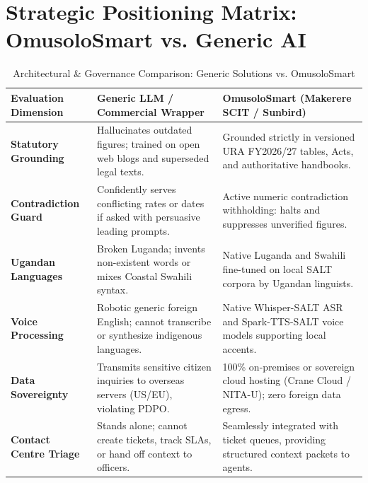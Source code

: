 \documentclass[10pt,a4paper]{article}
\begin{document}
\section{Strategic Positioning Matrix: OmusoloSmart vs. Generic AI}

\begin{table}[h!]
\centering
\small
\begin{tabularx}{\textwidth}{l X X}
\toprule
\textbf{Evaluation Dimension} & \textbf{Generic LLM / Commercial Wrapper} & \textbf{OmusoloSmart (Makerere SCIT / Sunbird)} \\
\midrule
\textbf{Statutory Grounding} & Hallucinates outdated figures; trained on open web blogs and superseded legal texts. & Grounded strictly in versioned URA FY2026/27 tables, Acts, and authoritative handbooks. \\
\addlinespace
\textbf{Contradiction Guard} & Confidently serves conflicting rates or dates if asked with persuasive leading prompts. & Active numeric contradiction withholding: halts and suppresses unverified figures. \\
\addlinespace
\textbf{Ugandan Languages} & Broken Luganda; invents non-existent words or mixes Coastal Swahili syntax. & Native Luganda and Swahili fine-tuned on local SALT corpora by Ugandan linguists. \\
\addlinespace
\textbf{Voice Processing} & Robotic generic foreign English; cannot transcribe or synthesize indigenous languages. & Native Whisper-SALT ASR and Spark-TTS-SALT voice models supporting local accents. \\
\addlinespace
\textbf{Data Sovereignty} & Transmits sensitive citizen inquiries to overseas servers (US/EU), violating PDPO. & 100\% on-premises or sovereign cloud hosting (Crane Cloud / NITA-U); zero foreign data egress. \\
\addlinespace
\textbf{Contact Centre Triage} & Stands alone; cannot create tickets, track SLAs, or hand off context to officers. & Seamlessly integrated with ticket queues, providing structured context packets to agents. \\
\bottomrule
\end{tabularx}
\caption{Architectural \& Governance Comparison: Generic Solutions vs. OmusoloSmart}
\end{table}
\end{document}
